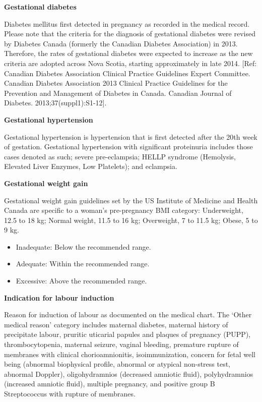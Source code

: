 \documentclass[
]{krantz}
\providecommand{\tightlist}{%
  \setlength{\itemsep}{0pt}\setlength{\parskip}{0pt}}
\begin{document}
\textbf{Gestational diabetes}

Diabetes mellitus first detected in pregnancy as recorded in the medical record. Please note that the criteria for the diagnosis of gestational diabetes were revised by Diabetes Canada (formerly the Canadian Diabetes Association) in 2013. Therefore, the rates of gestational diabetes were expected to increase as the new criteria are adopted across Nova Scotia, starting approximately in late 2014. {[}Ref: Canadian Diabetes Association Clinical Practice Guidelines Expert Committee. Canadian Diabetes Association 2013 Clinical Practice Guidelines for the Prevention and Management of Diabetes in Canada. Canadian Journal of Diabetes. 2013;37(suppl1):S1-12{]}.

\textbf{Gestational hypertension}

Gestational hypertension is hypertension that is first detected after the 20th week of gestation. Gestational hypertension with significant proteinuria includes those cases denoted as such; severe pre-eclampsia; HELLP syndrome (Hemolysis, Elevated Liver Enzymes, Low Platelets); and eclampsia.

\textbf{Gestational weight gain}

Gestational weight gain guidelines set by the US Institute of Medicine and Health Canada are specific to a woman's pre-pregnancy BMI category: Underweight, 12.5 to 18 kg; Normal weight, 11.5 to 16 kg; Overweight, 7 to 11.5 kg; Obese, 5 to 9 kg.

\begin{itemize}
\tightlist
\item
  Inadequate: Below the recommended range.
\item
  Adequate: Within the recommended range.
\item
  Excessive: Above the recommended range.
\end{itemize}

\textbf{Indication for labour induction}

Reason for induction of labour as documented on the medical chart. The `Other medical reason' category includes maternal diabetes, maternal history of precipitate labour, pruritic uticarial papules and plaques of pregnancy (PUPP), thrombocytopenia, maternal seizure, vaginal bleeding, premature rupture of membranes with clinical
chorioamnionitis, isoimmunization, concern for fetal well being (abnormal biophysical profile, abnormal or atypical non-stress test, abnormal Doppler), oligohydramnios (decreased amniotic fluid), polyhydramnios (increased amniotic fluid), multiple pregnancy, and positive group B Streptococcus with rupture of membranes.
\end{document}
